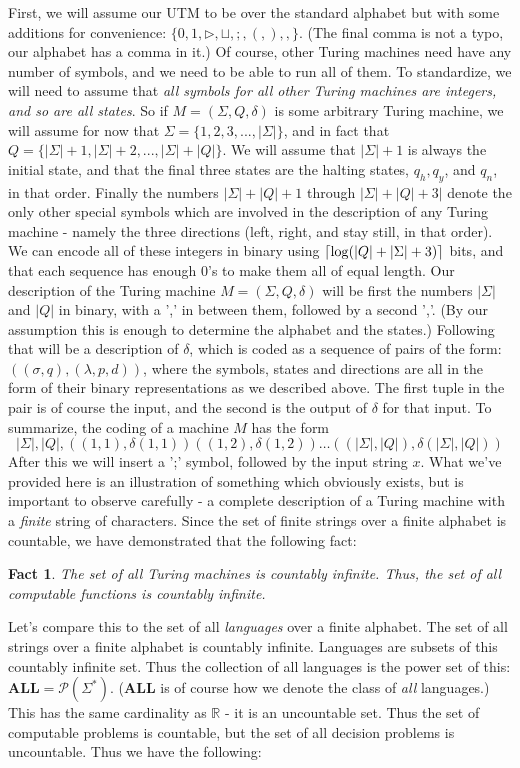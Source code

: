 \documentclass{article}
\DeclarePairedDelimiter{\ceil}{\lceil}{\rceil}
\theoremstyle{definition}
\theoremstyle{plain}
\theoremstyle{theorem}
\newtheorem{fact}{Fact}[section]
\begin{document}
First, we will assume our UTM to be over the standard alphabet but with some additions for convenience: $\{0,1,\triangleright, \sqcup,;,(,),,\}$. (The final comma is not a typo, our alphabet has a comma in it.) Of course, other Turing machines need have any number of symbols, and we need to be able to run all of them. To standardize, we will need to assume that \textit{all symbols for all other Turing machines are integers, and so are all states}.  So if $M = (\Sigma,Q,\delta)$ is some arbitrary Turing machine, we will assume for now that $\Sigma = \{1,2,3,...,|\Sigma|\}$, and in fact that $Q = \{|\Sigma|+1,|\Sigma|+2,...,|\Sigma|+|Q|\}$. We will assume that $|\Sigma|+1$ is always the initial state, and that the final three states are the halting states, $q_h,q_y$, and $q_n$, in that order. Finally the numbers $|\Sigma|+|Q|+1$ through $|\Sigma|+|Q|+3|$ denote the only other special symbols which are involved in the description of any Turing machine - namely the three directions (left, right, and stay still, in that order). We can encode all of these integers in binary using $\ceil{\log(|Q|+|\Sigma|+3)}$ bits, and that each sequence has enough $0$'s to make them all of equal length. Our description of the Turing machine $M = (\Sigma,Q,\delta)$ will be first the numbers $|\Sigma|$ and $|Q|$ in binary, with a ',' in between them, followed by a second ','. (By our assumption this is enough to determine the alphabet and the states.) Following that will be a description of $\delta$, which is coded as a sequence of pairs of the form: $((\sigma,q),(\lambda,p,d))$, where the symbols, states and directions are all in the form of their binary representations as we described above. The first tuple in the pair is of course the input, and the second is the output of $\delta$ for that input. To summarize, the coding of a machine $M$ has the form 
\[ |\Sigma|,|Q|,((1,1),\delta(1,1))((1,2),\delta(1,2))\ldots ((|\Sigma|,|Q|),\delta(|\Sigma|,|Q|)) \]
After this we will insert a ';' symbol, followed by the input string $x$. What we've provided here is an illustration of something which obviously exists, but is important to observe carefully - a complete description of a Turing machine with a \textit{finite} string of characters. Since the set of finite strings over a finite alphabet is countable, we have demonstrated that the following fact:
\begin{fact}
	The set of all Turing machines is countably infinite. Thus, the set of all computable functions is countably infinite.
\end{fact}
Let's compare this to the set of all \textit{languages} over a finite alphabet. The set of all strings over a finite alphabet is countably infinite. Languages are subsets of this countably infinite set. Thus the collection of all languages is the power set of this: $\bm{ALL} = \mathcal{P}(\Sigma^*)$. ($\bm{ALL}$ is of course how we denote the class of \textit{all} languages.) This has the same cardinality as $\mathbb{R}$ - it is an uncountable set. Thus the set of computable problems is countable, but the set of all decision problems is uncountable. Thus we have the following:
\end{document}
